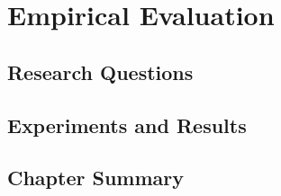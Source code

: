 \chapter{Empirical Evaluation}
\section{Research Questions}
\section{Experiments and Results}
\section{Chapter Summary}

